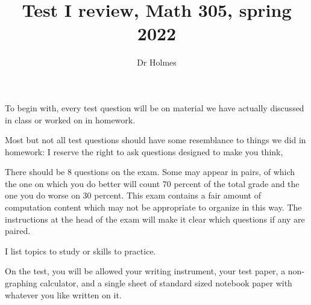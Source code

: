 \documentclass[12pt]{article}
\title{Test I review, Math 305, spring 2022}
\author{Dr Holmes}
\begin{document}
\maketitle
To begin with, every test question will be on material we have actually discussed in class or worked on in homework.

Most but not all test questions should have some resemblance to things we did in homework:  I reserve the right to ask questions designed to make you think,


There should be 8 questions on the exam.  Some may appear in pairs, of which the one on which you do better will count 70 percent of the total grade and the one you do worse on 30 percent.  This exam contains a fair amount of computation content which may not be appropriate to organize in this way.  The instructions at the head of the exam will make it clear which questions if any are paired.

I list topics to study or skills to practice.

On the test, you will be allowed your writing instrument, your test paper, a non-graphing calculator, and a single sheet of standard sized notebook paper with whatever you like written on it.
\end{document}

